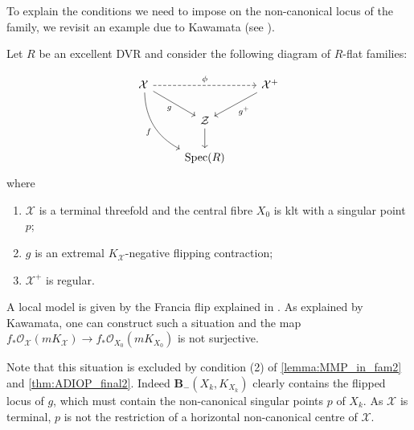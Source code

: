 To explain the conditions we need to impose on the non-canonical locus of the family, we revisit an example due to Kawamata (see \cite[Example 4.3]{Kaw99}).

\begin{example}	\label{ex-kawamata}
	Let $R$ be an excellent DVR and consider the following diagram of $R$-flat families:
	
	\[\begin{tikzcd}
	\mathcal{X} \ar[rr, dashed, "\phi"] \arrow[rd, "g",swap] \ar[rdd, bend right,
	"f",swap] &   & \mathcal{X}^{+}  \arrow[ld, "g^+"]  \\
	&  \mathcal{Z}    \ar[d]                             & 	\\
	& \Spec(R) &
	\end{tikzcd}
	\] 
	where
	\begin{enumerate}
		\item $\mathcal{X}$ is a terminal threefold and the central fibre $X_0$ is klt with a singular point $p$;
		\item $g$ is an extremal $K_{\mathcal{X}}$-negative flipping contraction;
		\item $\mathcal{X}^{+}$ is regular.
	\end{enumerate}
	A local model is given by the Francia flip explained in \cite{Kaw99}. 
	As explained by Kawamata, one can construct such a situation and the map
	$f_*\mathcal{O}_{\mathcal{X}}(mK_{\mathcal{X}}) \to f_* \mathcal{O}_{X_0}(mK_{X_0})$ is not surjective.
	
	
	Note that this situation is excluded by condition (2) of \autoref{lemma:MMP_in_fam2} and \autoref{thm:ADIOP_final2}.
	Indeed $\textbf{B}_{-}(X_k, K_{X_k})$ clearly contains the flipped locus of $g$, which must contain the non-canonical singular points $p$ of $X_k$. As $\mathcal{X}$ is terminal, $p$ is not the restriction of a horizontal non-canonical centre of $\mathcal{X}$.
\end{example}
	
